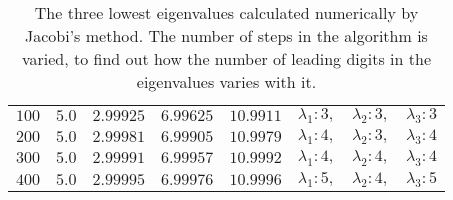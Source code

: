 \documentclass[12pt]{article}
\begin{document}
\begin{flushleft}
\begin{table}[!h]
\begin{center}
\begin{tabular}{| c | c | c | c | c | c |}
	\hline	
	$100$ & $5.0$ & $2.99925$ &  $6.99625$ & $10.9911$ & $\lambda_1:3,\quad \lambda_2:3,\quad \lambda_3:3$\\	
	$200$ & $5.0$ & $2.99981$ & $6.99905$ & $10.9979$ & $\lambda_1:4,\quad \lambda_2:3,\quad \lambda_3:4$ \\
    $300$ & $5.0$ & $2.99991$ & $6.99957$& $10.9992$ & $\lambda_1:4,\quad \lambda_2:4,\quad \lambda_3:4$\\
    $400$ & $5.0$ & $2.99995$ & $6.99976$& $10.9996$ & $\lambda_1:5,\quad \lambda_2:4,\quad \lambda_3:5$\\
  \hline
\end{tabular}
\end{center}
\caption{\label{tab:test_n_step}The three lowest eigenvalues calculated numerically by Jacobi's method. The number of steps in the algorithm is varied, to find out how the number of leading digits in the eigenvalues varies with it.}
\end{table}
\vspace{5mm}


\end{flushleft}
\end{document}
